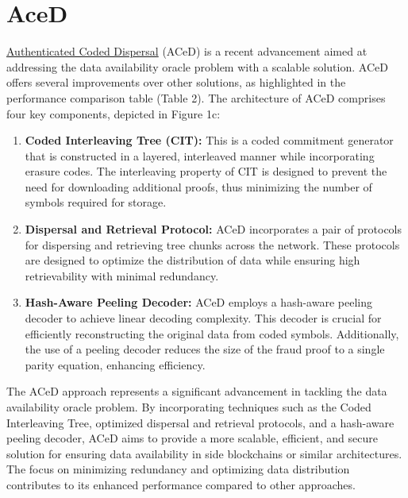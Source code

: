 \documentclass{report}
\begin{document}
\section{AceD}
\href{https://arxiv.org/abs/2011.00102}{Authenticated Coded Dispersal} (ACeD) is a recent advancement aimed at addressing the data availability oracle problem with a scalable solution. ACeD offers several improvements over other solutions, as highlighted in the performance comparison table (Table 2). The architecture of ACeD comprises four key components, depicted in Figure 1c:
\begin{enumerate}
	\item \textbf{Coded Interleaving Tree (CIT):} This is a coded commitment generator that is constructed in a layered, interleaved manner while incorporating erasure codes. The interleaving property of CIT is designed to prevent the need for downloading additional proofs, thus minimizing the number of symbols required for storage.
	\item \textbf{Dispersal and Retrieval Protocol:} ACeD incorporates a pair of protocols for dispersing and retrieving tree chunks across the network. These protocols are designed to optimize the distribution of data while ensuring high retrievability with minimal redundancy.
	\item \textbf{Hash-Aware Peeling Decoder:} ACeD employs a hash-aware peeling decoder to achieve linear decoding complexity. This decoder is crucial for efficiently reconstructing the original data from coded symbols. Additionally, the use of a peeling decoder reduces the size of the fraud proof to a single parity equation, enhancing efficiency.
\end{enumerate}
The ACeD approach represents a significant advancement in tackling the data availability oracle problem. By incorporating techniques such as the Coded Interleaving Tree, optimized dispersal and retrieval protocols, and a hash-aware peeling decoder, ACeD aims to provide a more scalable, efficient, and secure solution for ensuring data availability in side blockchains or similar architectures. The focus on minimizing redundancy and optimizing data distribution contributes to its enhanced performance compared to other approaches.
\end{document}
